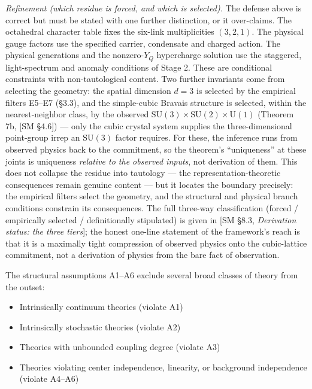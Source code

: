 \documentclass[
]{article}
\providecommand{\tightlist}{%
  \setlength{\itemsep}{0pt}\setlength{\parskip}{0pt}}
\begin{document}
\emph{Refinement (which residue is forced, and which is selected).} The
defense above is correct but must be stated with one further
distinction, or it over-claims. The octahedral character table fixes the
six-link multiplicities \((3,2,1)\). The physical gauge factors use the
specified carrier, condensate and charged action. The physical
generations and the nonzero-\(Y_Q\) hypercharge solution use the
staggered, light-spectrum and anomaly conditions of Stage 2. These are
conditional constraints with non-tautological content. Two further
invariants come from selecting the geometry: the spatial dimension
\(d=3\) is selected by the empirical filters E5--E7 (§3.3), and the
simple-cubic Bravais structure is selected, within the nearest-neighbor
class, by the observed
\(\mathrm{SU}(3) \times \mathrm{SU}(2) \times \mathrm{U}(1)\) (Theorem
7b, {[}SM §4.6{]}) --- only the cubic crystal system supplies the
three-dimensional point-group irrep an \(\mathrm{SU}(3)\) factor
requires. For these, the inference runs from observed physics back to
the commitment, so the theorem's ``uniqueness'' at these joints is
uniqueness \emph{relative to the observed inputs}, not derivation of
them. This does not collapse the residue into tautology --- the
representation-theoretic consequences remain genuine content --- but it
locates the boundary precisely: the empirical filters select the
geometry, and the structural and physical branch conditions constrain
its consequences. The full three-way classification (forced /
empirically selected / definitionally stipulated) is given in {[}SM
§8.3, \emph{Derivation status: the three tiers}{]}; the honest one-line
statement of the framework's reach is that it is a maximally tight
compression of observed physics onto the cubic-lattice commitment, not a
derivation of physics from the bare fact of observation.

The structural assumptions A1--A6 exclude several broad classes of
theory from the outset:

\begin{itemize}
\tightlist
\item
  Intrinsically continuum theories (violate A1)
\item
  Intrinsically stochastic theories (violate A2)
\item
  Theories with unbounded coupling degree (violate A3)
\item
  Theories violating center independence, linearity, or background
  independence (violate A4--A6)
\end{itemize}
\end{document}
